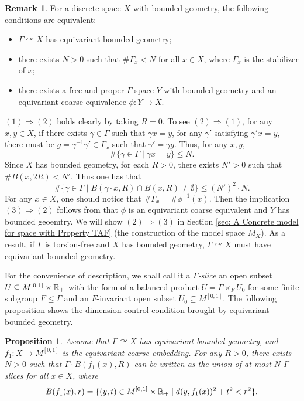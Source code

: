 \documentclass[11pt]{article}
\theoremstyle{definition}
\newtheorem{Rem}[Def]{Remark}
\theoremstyle{plain}
\newtheorem{Pro}[Def]{Proposition}
\def\Ga{\Gamma}
\def\car{\curvearrowright}
\begin{document}
\begin{Rem}\label{Rem ebg}
For a discrete space $X$ with bounded geometry, the following conditions are equivalent:\begin{itemize}
\item[(1)] $\Ga\car X$ has equivariant bounded geometry;
\item[(2)] there exists $N>0$ such that $\#\Ga_x<N$ for all $x\in X$, where $\Ga_x$ is the stabilizer of $x$;
\item[(3)] there exists a free and proper $\Ga$-space $Y$ with bounded geometry and an equivariant coarse equivalence $\phi: Y\to X$.
\end{itemize}
$(1)\Rightarrow(2)$ holds clearly by taking $R=0$. To see $(2)\Rightarrow(1)$, for any $x,y\in X$, if there exists $\gamma\in\Ga$ such that $\gamma x=y$, for any $\gamma'$ satisfying $\gamma'x=y$, there must be $g=\gamma^{-1}\gamma'\in\Ga_x$ such that $\gamma'=\gamma g$. Thus, for any $x,y$,
$$\#\{\gamma\in\Ga\mid \gamma x=y\}\leq N.$$
Since $X$ has bounded geometry, for each $R>0$, there exists $N'>0$ such that $\#B(x,2R)<N'$. Thus one has that
$$\#\{\gamma\in\Ga\mid B(\gamma\cdot x,R)\cap B(x,R)\ne\emptyset\}\leq (N')^2\cdot N.$$
For any $x\in X$, one should notice that $\#\Ga_x=\#\phi^{-1}(x)$. Then the implication $(3)\Rightarrow(2)$ follows from that $\phi$ is an equivariant coarse equivalent and $Y$ has bounded geoemtry. We will show $(2)\Rightarrow (3)$ in Section \ref{sec: A Concrete model for space with Property TAF} (the construction of the model space $M_X$). As a result, if $\Ga$ is torsion-free and $X$ has bounded geometry, $\Ga\car X$ must have equivariant bounded geometry.
\end{Rem}



For the convenience of description, we shall call it a \emph{$\Ga$-slice} an open subset $U\subseteq M^{[0,1]}\times\mathbb R_+$ with the form of a balanced product $U=\Ga\times_{F}U_0$ for some finite subgroup $F\leq \Ga$ and an $F$-invariant open subset $U_0\subseteq M^{[0,1]}$. The following proposition shows the dimension control condition brought by equivariant bounded geometry.

\begin{Pro}\label{equi-bg}
Assume that $\Ga\car X$ has equivariant bounded geometry, and $f_1: X\to M^{[0,1]}$ is the equivariant coarse embedding. For any $R>0$, there exists $N>0$ such that $\Ga\cdot B(f_1(x), R)$ can be written as the union of at most $N$ $\Ga$-slices for all $x\in X$, where
$$B(f_1(x),r)=\{(y,t)\in M^{[0,1]}\times\mathbb R_+\mid d(y,f_1(x))^2+t^2<r^2\}.$$
\end{Pro}
\end{document}
